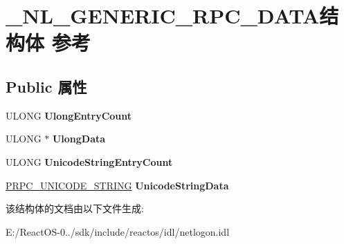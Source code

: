 \hypertarget{struct___n_l___g_e_n_e_r_i_c___r_p_c___d_a_t_a}{}\section{\+\_\+\+N\+L\+\_\+\+G\+E\+N\+E\+R\+I\+C\+\_\+\+R\+P\+C\+\_\+\+D\+A\+T\+A结构体 参考}
\label{struct___n_l___g_e_n_e_r_i_c___r_p_c___d_a_t_a}
\subsection*{Public 属性}
\begin{DoxyCompactItemize}
\item 
\mbox{\label{struct___n_l___g_e_n_e_r_i_c___r_p_c___d_a_t_a_a2c11a4c01cbd78a4f71ed7c7da6c246a}} 
U\+L\+O\+NG {\bfseries Ulong\+Entry\+Count}
\item 
\mbox{\label{struct___n_l___g_e_n_e_r_i_c___r_p_c___d_a_t_a_a2eecf434a3fc0a64dbfc5ded6a00b364}} 
U\+L\+O\+NG $\ast$ {\bfseries Ulong\+Data}
\item 
\mbox{\label{struct___n_l___g_e_n_e_r_i_c___r_p_c___d_a_t_a_a81ad7b04b712e4b9c1300e36630d2bd3}} 
U\+L\+O\+NG {\bfseries Unicode\+String\+Entry\+Count}
\item 
\mbox{\label{struct___n_l___g_e_n_e_r_i_c___r_p_c___d_a_t_a_a861deec35b355bc7c06cd6f585887d86}} 
\hyperlink{struct___r_p_c___u_n_i_c_o_d_e___s_t_r_i_n_g}{P\+R\+P\+C\+\_\+\+U\+N\+I\+C\+O\+D\+E\+\_\+\+S\+T\+R\+I\+NG} {\bfseries Unicode\+String\+Data}
\end{DoxyCompactItemize}


该结构体的文档由以下文件生成\+:\begin{DoxyCompactItemize}
\item 
E\+:/\+React\+O\+S-\/0../sdk/include/reactos/idl/netlogon.\+idl\end{DoxyCompactItemize}
